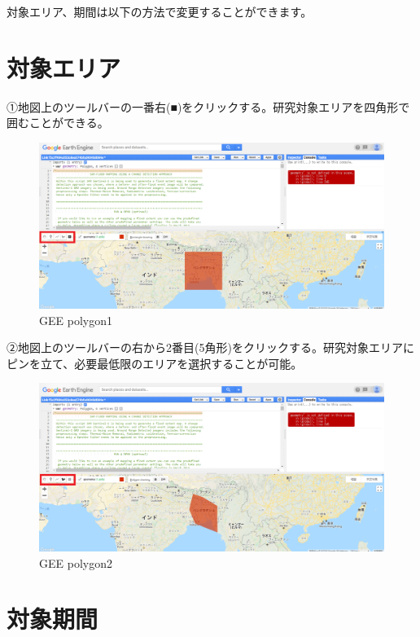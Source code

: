 \documentclass[
]{book}
\begin{document}
対象エリア、期間は以下の方法で変更することができます。

\hypertarget{ux5bfeux8c61ux30a8ux30eaux30a2}{%
\section{対象エリア}\label{ux5bfeux8c61ux30a8ux30eaux30a2}}

①地図上のツールバーの一番右(■)をクリックする。研究対象エリアを四角形で囲むことができる。

\begin{figure}
\centering
\includegraphics{images/geepolygon1.png}
\caption{GEE polygon1}
\end{figure}

②地図上のツールバーの右から2番目(5角形)をクリックする。研究対象エリアにピンを立て、必要最低限のエリアを選択することが可能。　　

\begin{figure}
\centering
\includegraphics{images/geepolygon2.png}
\caption{GEE polygon2}
\end{figure}

\hypertarget{ux5bfeux8c61ux671fux9593}{%
\section{対象期間}\label{ux5bfeux8c61ux671fux9593}}
\end{document}
